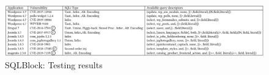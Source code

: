 \begin{figure}
\centering
\includegraphics[scale=0.75]{sqlblock.PNG}
\caption{SQLBlock: Testing results \autocite[12]{Jahanshahi2018}}
\label{sqlblock}
\end{figure}

\clearpage


